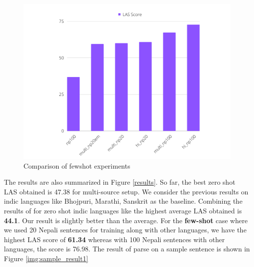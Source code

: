 \begin{figure}[!h]
    \center
    \includegraphics[scale=0.3]{images/fewshot_comparison}
    \caption{Comparison of fewshot experiments}
    \label{fewshot_comparison}
\end{figure}


The results are also summarized in Figure \ref{results}. So far, the best zero
shot LAS obtained is 47.38 for multi-source setup. We consider the previous
results on indic languages like Bhojpuri, Marathi, Sanskrit as the baseline.
Combining the results of \cite{zero-shot}\cite{udapter} for zero shot indic
languages like the highest average LAS obtained is \textbf{44.1}. Our result is
slightly better than the average. For the \textbf{few-shot} case where we used 20
Nepali sentences for training along with other languages, we have the highest
LAS score of \textbf{61.34} whereas with 100 Nepali sentences with
other languages, the score is 76.98. The result of parse on a sample sentence is shown in Figure \ref{img:sample_result1}

